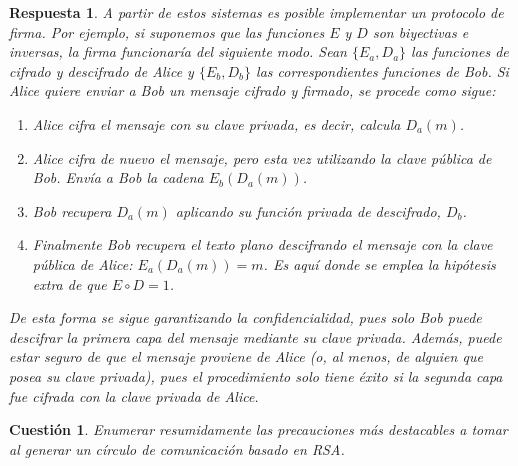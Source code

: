 \documentclass[
  a4paper,
  spanish,
  12pt,
]{scrartcl}
\theoremstyle{ejercicio-style}
\newtheorem{ejer}{Cuestión}
\theoremstyle{remark-style}
\newtheorem*{sol}{Respuesta}
\theoremstyle{teorema-style}
\begin{document}
\begin{sol}
  A partir de estos sistemas es posible implementar un protocolo de firma.
  Por ejemplo, si suponemos que las funciones $E$ y $D$ son biyectivas e inversas, la firma funcionaría del siguiente modo. Sean $\{ E_a, D_a \}$ las funciones de cifrado y descifrado de Alice y $\{ E_b, D_b \}$ las correspondientes funciones de Bob. Si Alice quiere enviar a Bob un mensaje cifrado y firmado, se procede como sigue:

  \begin{enumerate}
    \item Alice cifra el mensaje con su clave privada, es decir, calcula $D_a(m)$.
    \item Alice cifra de nuevo el mensaje, pero esta vez utilizando la clave pública de Bob. Envía a Bob la cadena $E_b(D_a(m))$.
    \item Bob recupera $D_a(m)$ aplicando su función privada de descifrado, $D_b$.
    \item Finalmente Bob recupera el texto plano descifrando el mensaje con la clave pública de Alice: $E_a(D_a(m)) = m$. Es aquí donde se emplea la hipótesis extra de que $E \circ D = 1$.
  \end{enumerate}

  De esta forma se sigue garantizando la confidencialidad, pues solo Bob puede descifrar la primera capa del mensaje mediante su clave privada. Además, puede estar seguro de que el mensaje proviene de Alice (o, al menos, de alguien que posea su clave privada), pues el procedimiento solo tiene éxito si la segunda capa fue cifrada con la clave privada de Alice.

\end{sol}


\begin{ejer}
  Enumerar resumidamente las precauciones más destacables a tomar al generar un círculo de comunicación basado en RSA.
\end{ejer}
\end{document}
